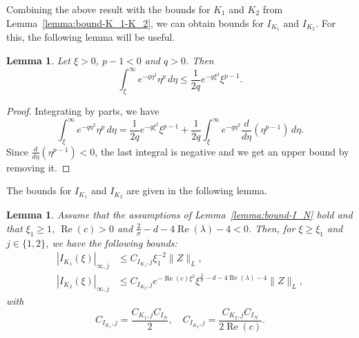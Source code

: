 \documentclass[11pt]{article}
\DeclareMathOperator{\real}{Re}
\newtheorem{lemma}[definition]{Lemma}
\begin{document}
Combining the above result with the bounds for \(K_{1}\) and \(K_{2}\)
from Lemma~\ref{lemma:bound-K_1-K_2}, we can obtain bounds for
\(I_{K_{1}}\) and \(I_{K_{2}}\). For this, the following lemma will be
useful.

\begin{lemma}\label{lemma:exponential-integral-bound}
  Let \(\xi > 0\), \(p - 1 < 0\) and \(q > 0\). Then
  \begin{equation*}
    \int_{\xi}^{\infty} e^{-q\eta^{2}}\eta^{p}\,d\eta \leq \frac{1}{2q}e^{-q\xi^{2}}\xi^{p - 1}.
  \end{equation*}
\end{lemma}

\begin{proof}
  Integrating by parts, we have
  \begin{equation*}
    \int_{\xi}^{\infty} e^{-q\eta^{2}}\eta^{p}\,d\eta
    = \frac{1}{2q}e^{-q\xi^{2}}\xi^{p - 1}
    + \frac{1}{2q}\int_{\xi}^{\infty} e^{-q\eta^{2}}\frac{d}{d\eta}\left(\eta^{p - 1}\right)\,d\eta.
  \end{equation*}
  Since \(\frac{d}{d\eta}\left(\eta^{p - 1}\right) < 0\), the last
  integral is negative and we get an upper bound by removing it.
\end{proof}

The bounds for \(I_{K_{1}}\) and \(I_{K_{2}}\) are given in the
following lemma.

\begin{lemma}\label{lemma:I_K_1-I_K_2-bounds}
  Assume that the assumptions of Lemma~\ref{lemma:bound-I_N} hold and
  that \(\xi_{1} \geq 1\), \(\real(c) > 0\) and
  \(\frac{2}{\sigma} - d - 4\real(\lambda) - 4 < 0\).
  Then, for \(\xi \geq \xi_{1}\) and \(j \in \{1, 2\}\), we have the
  following bounds:
  \begin{align*}
    |I_{K_{1}}(\xi)|_{\infty,j} &\leq C_{I_{K_{1}},j}\xi_{1}^{-2}\|Z\|_{L},\\
    |I_{K_{2}}(\xi)|_{\infty,j} &\leq C_{I_{K_{2}},j}e^{-\real(c)\xi^{2}}\xi^{\frac{2}{\sigma} - d - 4\real(\lambda) - 4}\|Z\|_{L},
  \end{align*}
  with
  \begin{equation*}
    C_{I_{K_{1}},j} = \frac{C_{K_{1},j}C_{I_{N}}}{2},\quad
    C_{I_{K_{2}},j} = \frac{C_{K_{2},j}C_{I_{N}}}{2\real(c)}.
  \end{equation*}
\end{lemma}
\end{document}
